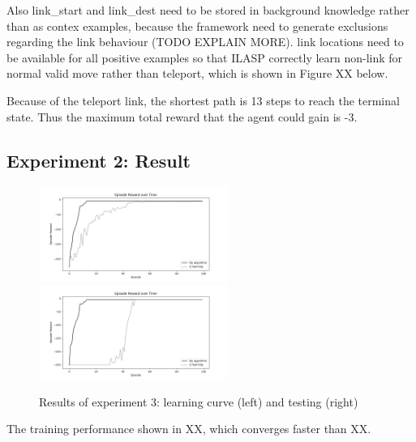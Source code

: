 Also link\_start and link\_dest need to be stored in background knowledge rather than as contex examples,
because the framework need to generate exclusions regarding the link behaviour (TODO EXPLAIN MORE).
link locations need to be available for all positive examples so that ILASP correctly learn non-link for normal valid move rather than teleport, which is shown in Figure XX below.

Because of the teleport link, the shortest path is 13 steps to reach the terminal state. Thus the maximum total reward that the agent could gain is -3.

\subsection{Experiment 2: Result}
\label{subsec:experiment2_result}
    
\begin{figure}[!htb]
\centerline{
\includegraphics[width=0.55\textwidth]{./figures/experiment2_training}
\includegraphics[width=0.55\textwidth]{./figures/experiment2_test}
}
\caption{Results of experiment 3: learning curve (left) and testing (right)}
\label{experiment2_training}
\end{figure}

The training performance shown in XX, which converges faster than XX.



